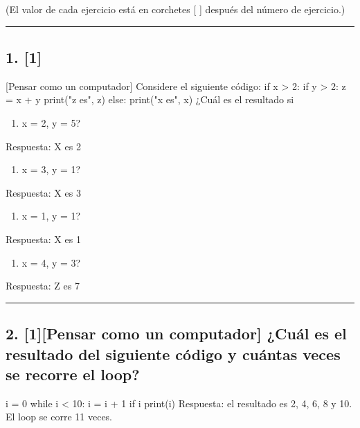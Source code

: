 \documentclass[11pt]{article}
\providecommand{\tightlist}{%
      \setlength{\itemsep}{0pt}\setlength{\parskip}{0pt}}
\begin{document}
(El valor de cada ejercicio está en corchetes {[} {]} después del número
de ejercicio.)

    \begin{center}\rule{0.5\linewidth}{\linethickness}\end{center}

    \subsection{1. {[}1{]}}\label{section}

{[}Pensar como un computador{]} Considere el siguiente código:
if x > 2:
    if y > 2:
        z = x + y
        print("z es", z)
else:
    print("x es", x)
    ¿Cuál es el resultado si

\begin{enumerate}
\def\labelenumi{\alph{enumi})}
\tightlist
\item
  x = 2, y = 5?
\end{enumerate}

Respuesta: X es 2

\begin{enumerate}
\def\labelenumi{\alph{enumi})}
\setcounter{enumi}{1}
\tightlist
\item
  x = 3, y = 1?
\end{enumerate}

Respuesta: X es 3

\begin{enumerate}
\def\labelenumi{\alph{enumi})}
\setcounter{enumi}{2}
\tightlist
\item
  x = 1, y = 1?
\end{enumerate}

Respuesta: X es 1

\begin{enumerate}
\def\labelenumi{\alph{enumi})}
\setcounter{enumi}{3}
\tightlist
\item
  x = 4, y = 3?
\end{enumerate}

Respuesta: Z es 7

    \begin{center}\rule{0.5\linewidth}{\linethickness}\end{center}

    \subsection{2. {[}1{]}{[}Pensar como un computador{]} ¿Cuál es el
resultado del siguiente código y cuántas veces se recorre el
loop?}\label{pensar-como-un-computador-cuuxe1l-es-el-resultado-del-siguiente-cuxf3digo-y-cuuxe1ntas-veces-se-recorre-el-loop}
i = 0
while i < 10:
    i = i + 1
    if i %
        print(i)
    Respuesta: el resultado es 2, 4, 6, 8 y 10. El loop se corre 11 veces.
\end{document}
